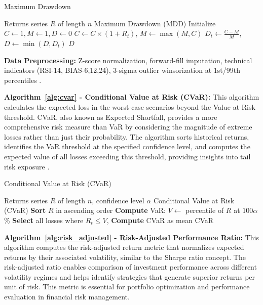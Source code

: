 \documentclass[3p,times,procedia]{elsarticle}
\begin{document}
\begin{algorithm}[H]\footnotesize\setlength{\abovecaptionskip}{-2pt}
\caption{Maximum Drawdown}
\label{alg:max_drawdown}
\begin{algorithmic}[1]
    \Require Returns series \( R \) of length \( n \)
    \Ensure Maximum Drawdown (MDD)
    \State Initialize \( C \gets 1, M \gets 1, D \gets 0 \)
        \State \( C \gets C \times (1 + R_t) \), \( M \gets \max(M, C) \)
        \State \( D_t \gets \frac{C - M}{M} \), \( D \gets \min(D, D_t) \)
    \EndFor
    \State \Return \( D \)
\end{algorithmic}
\end{algorithm}

\textbf{Data Preprocessing:} Z-score normalization, forward-fill imputation, technical indicators (RSI-14, BIAS-6,12,24), 3-sigma outlier winsorization at 1st/99th percentiles \cite{Fischer2018}.

\textbf{Algorithm~\ref{alg:cvar} - Conditional Value at Risk (CVaR):} This algorithm calculates the expected loss in the worst-case scenarios beyond the Value at Risk threshold. CVaR, also known as Expected Shortfall, provides a more comprehensive risk measure than VaR by considering the magnitude of extreme losses rather than just their probability. The algorithm sorts historical returns, identifies the VaR threshold at the specified confidence level, and computes the expected value of all losses exceeding this threshold, providing insights into tail risk exposure \cite{Rockafellar2000}.

\begin{algorithm}[H]\footnotesize\setlength{\abovecaptionskip}{-2pt}
\caption{Conditional Value at Risk (CVaR)}
\label{alg:cvar}
\begin{algorithmic}[1]
    \Require Returns series $R$ of length $n$, confidence level $\alpha$
    \Ensure Conditional Value at Risk (CVaR)
    \State \textbf{Sort} $R$ in ascending order 
    \State \textbf{Compute} VaR: $V \gets$ percentile of $R$ at $100\alpha$\%
    \State \textbf{Select} all losses where $R_t \leq V$, \textbf{Compute} CVaR as mean
    \State \Return CVaR
\end{algorithmic}
\end{algorithm}

\textbf{Algorithm~\ref{alg:risk_adjusted} - Risk-Adjusted Performance Ratio:} This algorithm computes the risk-adjusted return metric that normalizes expected returns by their associated volatility, similar to the Sharpe ratio concept. The risk-adjusted ratio enables comparison of investment performance across different volatility regimes and helps identify strategies that generate superior returns per unit of risk. This metric is essential for portfolio optimization and performance evaluation in financial risk management.
\end{document}
